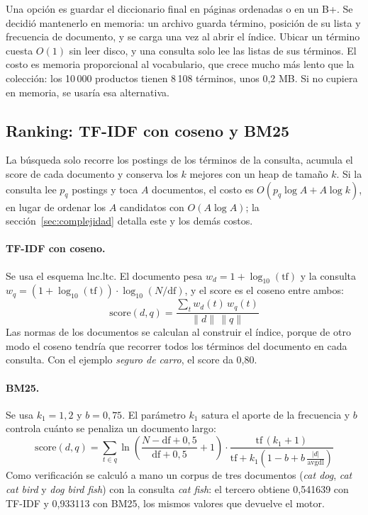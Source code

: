 \documentclass[11pt,a4paper]{article}
\begin{document}
Una opción es guardar el diccionario final en páginas ordenadas o en un B+. Se decidió mantenerlo en memoria: un archivo guarda término, posición de su lista y frecuencia de documento, y se carga una vez al abrir el índice. Ubicar un término cuesta $O(1)$ sin leer disco, y una consulta solo lee las listas de sus términos. El costo es memoria proporcional al vocabulario, que crece mucho más lento que la colección: los 10\,000 productos tienen 8\,108 términos, unos 0,2 MB. Si no cupiera en memoria, se usaría esa alternativa.

\subsection{Ranking: TF-IDF con coseno y BM25}

La búsqueda solo recorre los postings de los términos de la consulta, acumula el score de cada documento y conserva los $k$ mejores con un heap de tamaño $k$. Si la consulta lee $p_q$ postings y toca $A$ documentos, el costo es $O(p_q \log A + A \log k)$, en lugar de ordenar los $A$ candidatos con $O(A \log A)$; la sección~\ref{sec:complejidad} detalla este y los demás costos.

\paragraph{TF-IDF con coseno.} Se usa el esquema lnc.ltc. El documento pesa $w_d = 1 + \log_{10}(\mathrm{tf})$ y la consulta $w_q = (1 + \log_{10}(\mathrm{tf})) \cdot \log_{10}(N / \mathrm{df})$, y el score es el coseno entre ambos:
\[
  \mathrm{score}(d, q) = \frac{\sum_{t} w_d(t)\, w_q(t)}{\lVert d \rVert\, \lVert q \rVert}
\]
Las normas de los documentos se calculan al construir el índice, porque de otro modo el coseno tendría que recorrer todos los términos del documento en cada consulta. Con el ejemplo \emph{seguro de carro}, el score da 0,80.

\paragraph{BM25.} Se usa $k_1 = 1{,}2$ y $b = 0{,}75$. El parámetro $k_1$ satura el aporte de la frecuencia y $b$ controla cuánto se penaliza un documento largo:
\[
  \mathrm{score}(d, q) = \sum_{t \in q} \ln\!\left(\frac{N - \mathrm{df} + 0{,}5}{\mathrm{df} + 0{,}5} + 1\right) \cdot \frac{\mathrm{tf}\,(k_1 + 1)}{\mathrm{tf} + k_1 \left(1 - b + b\, \frac{|d|}{\mathrm{avgdl}}\right)}
\]
Como verificación se calculó a mano un corpus de tres documentos (\emph{cat dog}, \emph{cat cat bird} y \emph{dog bird fish}) con la consulta \emph{cat fish}: el tercero obtiene 0,541639 con TF-IDF y 0,933113 con BM25, los mismos valores que devuelve el motor.
\end{document}
